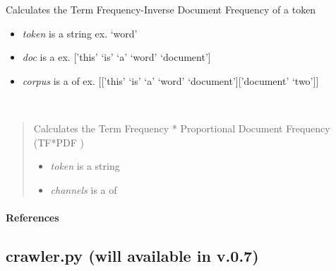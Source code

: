 \documentclass[letterpaper,10pt,english]{sphinxmanual}
\begin{document}

\begin{fulllineitems}
\label{theseus:theseus.tfidf}
Calculates the Term Frequency-Inverse Document Frequency of a token
\begin{itemize}
\item {} 
\emph{token} is a string               ex. `word'

\item {} 
\emph{doc} is a                  ex. {[}'this' `is' `a' `word' `document'{]}

\item {} 
\emph{corpus} is a  of     ex. {[}{[}'this' `is' `a' `word' `document'{]}{[}'document' `two'{]}{]}

\end{itemize}

\end{fulllineitems}


\begin{fulllineitems}
\label{theseus:theseus.tfpdf}~\begin{quote}

Calculates the Term Frequency * Proportional Document Frequency (TF*PDF )
\begin{itemize}
\item {} 
\emph{token} is a string

\item {} 
\emph{channels} is a  of 

\end{itemize}
\end{quote}
\paragraph{References}

\end{fulllineitems}



\subsection{crawler.py (will available in v.0.7)}
\label{theseus:crawler-py-will-available-in-v-0-7}
\end{document}
